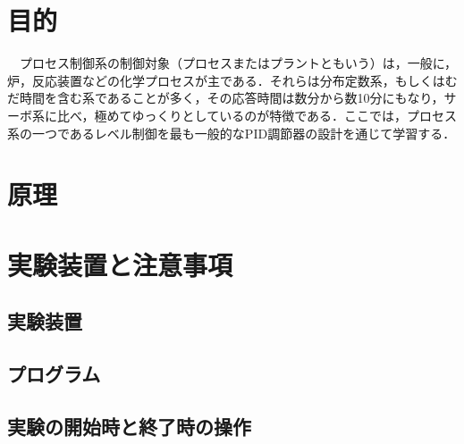 \documentclass[12pt]{jsarticle}
\begin{document}
\section{目的}
　プロセス制御系の制御対象（プロセスまたはプラントともいう）は，一般に，炉，反応装置などの化学プロセスが主である．それらは分布定数系，もしくはむだ時間を含む系であることが多く，その応答時間は数分から数10分にもなり，サーボ系に比べ，極めてゆっくりとしているのが特徴である．ここでは，プロセス系の一つであるレベル制御を最も一般的なPID調節器の設計を通じて学習する．
\section{原理}
\section{実験装置と注意事項}
\subsection{実験装置}
\subsection{プログラム}
\subsection{実験の開始時と終了時の操作}
\end{document}
